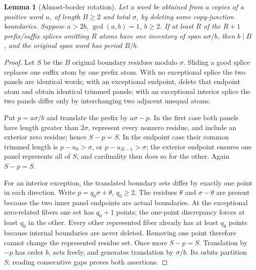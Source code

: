 \documentclass[11pt,a4paper]{amsart}
\numberwithin{equation}{section}
\theoremstyle{plain}
\newtheorem{lemma}[theorem]{Lemma}
\theoremstyle{definition}
\begin{document}
\begin{lemma}[Almost-border rotation]\label{lem:almost-border}
Let a word be obtained from \(a\) copies of a positive word \(u\), of length \(B\ge2\) and total \(\sigma\), by deleting some copy-junction boundaries.  Suppose \(a>2b\), \(\gcd(a,b)=1\), \(b\ge2\).  If at least \(R\) of the \(R+1\) prefix/suffix splices omitting \(R\) atoms have one inventory of span \(a\sigma/b\), then \(b\mid B\), and the original span word has period \(B/b\).
\end{lemma}
\begin{proof}
Let \(S\) be the \(B\) original boundary residues modulo \(\sigma\).  Sliding a good splice replaces one suffix atom by one prefix atom.  With no exceptional splice the two panels are identical words; with an exceptional endpoint, delete that endpoint atom and obtain identical trimmed panels; with an exceptional interior splice the two panels differ only by interchanging two adjacent unequal atoms.

Put \(p=a\sigma/b\) and translate the prefix by \(a\sigma-p\).  In the first case both panels have length greater than \(2\sigma\), represent every nonzero residue, and include an exterior zero residue; hence \(S-p=S\).  In the endpoint case their common trimmed length is \(p-u_0>\sigma\), or \(p-u_{B-1}>\sigma\); the exterior endpoint ensures one panel represents all of \(S\), and cardinality then does so for the other.  Again \(S-p=S\).

For an interior exception, the translated boundary sets differ by exactly one point in each direction.  Write \(p=q_0\sigma+\theta\), \(q_0\ge2\).  The residues \(\theta\) and \(\sigma-\theta\) are present because the two inner panel endpoints are actual boundaries.  At the exceptional zero-related fibers one set has \(q_0+1\) points; the one-point discrepancy forces at least \(q_0\) in the other.  Every other represented fiber already has at least \(q_0\) points because internal boundaries are never deleted.  Removing one point therefore cannot change the represented residue set.  Once more \(S-p=S\).  Translation by \(-p\) has order \(b\), acts freely, and generates translation by \(\sigma/b\).  Its orbits partition \(S\); reading consecutive gaps proves both assertions.
\end{proof}
\end{document}
